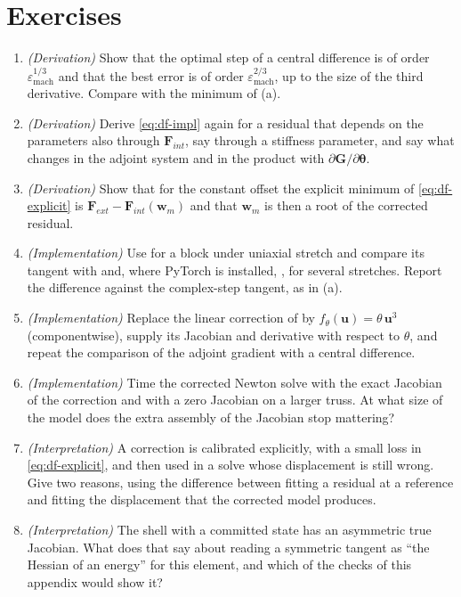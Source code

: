 \section*{Exercises}\label{sec:df-exercises}

\begin{enumerate}
\item \emph{(Derivation)} Show that the optimal step of a central difference is of order $\varepsilon_{\mathrm{mach}}^{1/3}$ and that the best error is of order $\varepsilon_{\mathrm{mach}}^{2/3}$, up to the size of the third derivative. Compare with the minimum of (a).
\item \emph{(Derivation)} Derive \eqref{eq:df-impl} again for a residual that depends on the parameters also through $\bm F_{int}$, say through a stiffness parameter, and say what changes in the adjoint system and in the product with $\partial\bm G/\partial\bm\theta$.
\item \emph{(Derivation)} Show that for the constant offset the explicit minimum of \eqref{eq:df-explicit} is $\bm F_{ext}-\bm F_{int}(\bm w_m)$ and that $\bm w_m$ is then a root of the corrected residual.
\item \emph{(Implementation)} Use  for a block under uniaxial stretch and compare its tangent with  and, where PyTorch is installed, , for several stretches. Report the difference against the complex-step tangent, as in (a).
\item \emph{(Implementation)} Replace the linear correction of  by $f_\theta(\bm u)=\theta\,\bm u^{3}$ (componentwise), supply its Jacobian and derivative with respect to $\theta$, and repeat the comparison of the adjoint gradient with a central difference.
\item \emph{(Implementation)} Time the corrected Newton solve with the exact Jacobian of the correction and with a zero Jacobian on a larger truss. At what size of the model does the extra assembly of the Jacobian stop mattering?
\item \emph{(Interpretation)} A correction is calibrated explicitly, with a small loss in \eqref{eq:df-explicit}, and then used in a solve whose displacement is still wrong. Give two reasons, using the difference between fitting a residual at a reference and fitting the displacement that the corrected model produces.
\item \emph{(Interpretation)} The shell with a committed state has an asymmetric true Jacobian. What does that say about reading a symmetric tangent as ``the Hessian of an energy'' for this element, and which of the checks of this appendix would show it?
\end{enumerate}

\chapterrefs
